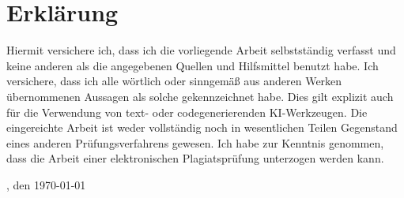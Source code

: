 \section*{Erklärung}
\vspace*{0.5cm}
\noindent
Hiermit versichere ich, dass ich die vorliegende Arbeit selbstständig verfasst und keine anderen als die angegebenen Quellen und Hilfsmittel benutzt habe. Ich versichere, dass ich alle wörtlich oder sinngemäß aus anderen Werken übernommenen Aussagen als solche gekennzeichnet habe. Dies gilt explizit auch für die Verwendung von text- oder codegenerierenden KI-Werkzeugen.
\newline
Die eingereichte Arbeit ist weder vollständig noch in wesentlichen Teilen Gegenstand eines anderen Prüfungsverfahrens gewesen.
\newline
Ich habe zur Kenntnis genommen, dass die Arbeit einer elektronischen Plagiatsprüfung unterzogen werden kann.

\vspace{3cm}
\toponym, den \today